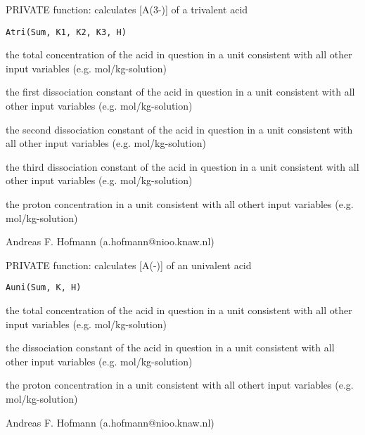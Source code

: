 \documentclass{article}
\begin{document}
\begin{Description}\relax
PRIVATE function: calculates [A(3-)] of a trivalent acid
\end{Description}
\begin{Usage}
\begin{verbatim}Atri(Sum, K1, K2, K3, H)\end{verbatim}
\end{Usage}
\begin{Arguments}
\begin{ldescription}
\item[\code{Sum }] the total concentration of the acid in question in a unit consistent with all other input variables (e.g. mol/kg-solution)
\item[\code{K1 }] the first dissociation constant of the acid in question in a unit consistent with all other input variables (e.g. mol/kg-solution)
\item[\code{K2 }] the second dissociation constant of the acid in question in a unit consistent with all other input variables (e.g. mol/kg-solution)
\item[\code{K3 }] the third dissociation constant of the acid in question in a unit consistent with all other input variables (e.g. mol/kg-solution)
\item[\code{H }] the proton concentration in a unit consistent with all othert input variables (e.g. mol/kg-solution)
\end{ldescription}
\end{Arguments}
\begin{Author}\relax
Andreas F. Hofmann (a.hofmann@nioo.knaw.nl)
\end{Author}

\begin{Description}\relax
PRIVATE function: calculates [A(-)] of an univalent acid
\end{Description}
\begin{Usage}
\begin{verbatim}Auni(Sum, K, H)\end{verbatim}
\end{Usage}
\begin{Arguments}
\begin{ldescription}
\item[\code{Sum }] the total concentration of the acid in question in a unit consistent with all other input variables (e.g. mol/kg-solution)
\item[\code{K }] the dissociation constant of the acid in question in a unit consistent with all other input variables (e.g. mol/kg-solution)
\item[\code{H }] the proton concentration in a unit consistent with all othert input variables (e.g. mol/kg-solution)
\end{ldescription}
\end{Arguments}
\begin{Author}\relax
Andreas F. Hofmann (a.hofmann@nioo.knaw.nl)
\end{Author}
\end{document}
